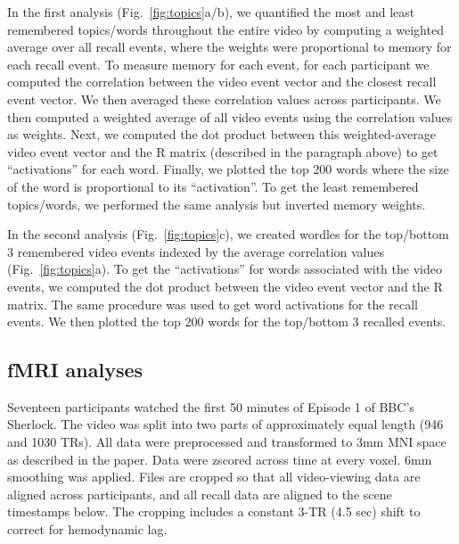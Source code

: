 \documentclass{article}
\begin{document}
{In the first analysis (Fig.~\ref{fig:topics}a/b), we quantified the most and least remembered topics/words throughout the entire video by computing a weighted average over all recall events, where the weights were proportional to memory for each recall event. To measure memory for each event, for each participant we computed the correlation between the video event vector and the closest recall event vector. We then averaged these correlation values across participants. We then computed a weighted average of all video events using the correlation values as weights. Next, we computed the dot product between this weighted-average video event vector and the R matrix (described in the paragraph above) to get ``activations'' for each word. Finally, we plotted the top 200 words where the size of the word is proportional to its ``activation''. To get the least remembered topics/words, we performed the same analysis but inverted memory weights.

In the second analysis (Fig.~\ref{fig:topics}c), we created wordles for the top/bottom 3 remembered video events indexed by the average correlation values (Fig.~\ref{fig:topics}a).  To get the ``activations'' for words associated with the video events, we computed the dot product between the video event vector and the R matrix. The same procedure was used to get word activations for the recall events. We then plotted the top 200 words for the top/bottom 3 recalled events.

 \subsection{fMRI analyses}
 Seventeen participants watched the first 50 minutes of Episode 1 of BBC's Sherlock. The video was split into two parts of approximately equal length (946 and 1030 TRs). All data were preprocessed and transformed to 3mm MNI space as described in the paper. Data were zscored across time at every voxel. 6mm smoothing was applied.
 Files are cropped so that all video-viewing data are aligned across participants, and all recall data are aligned to the scene timestamps below. The cropping includes a constant 3-TR (4.5 sec) shift to correct for hemodynamic lag.

}
\end{document}
